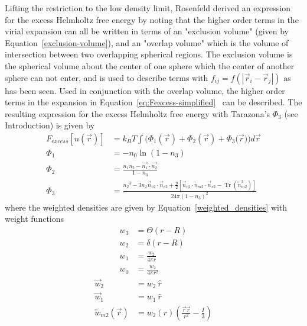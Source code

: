 \documentclass[double,12pt]{beavtex}
\begin{document}
Lifting the restriction to the low density limit, Rosenfeld derived an
expression for the excess Helmholtz free energy by noting that the higher
order terms in the virial expansion can all be written in terms of an 
"exclusion volume" (given by Equation~\ref{exclusion-volume}), 
and an "overlap volume" which is the volume of intersection between two 
overlapping spherical regions.
The exclusion volume is the spherical volume about the center of one sphere 
which the center of another sphere can not enter, and is used to describe
terms with $f_{ij}=f(|\vec r_i - \vec r_j|)$ as has been seen. Used in conjunction 
with the overlap volume, the higher order terms in the expansion
in Equation~\ref{eq:Fexcess-simplified}~\cite{rosenfeld1988} can be described. 
%
The resulting expression for the excess Helmholtz free energy with Tarazona's $\Phi_3$
(see Introduction) is given by
\begin{align}
    F_{excess}[n(\vec{r})] &= k_BT\int(\Phi_1(\vec{r})+\Phi_2(\vec{r})+\Phi_3(\vec{r}{)) d}\vec{r} \\
    \Phi_1 &= -n_{0}\ln(1-n_{3}) \\
    \Phi_2 &= \frac{n_{1}n_{2}-\vec{n_{1}}\cdot\vec{n_{2}}}{1-n_{3}} \\
    \Phi_3 &= \frac{{n_2}^3-3n_2\vec{n}_{v2}\cdot\vec{n}_{v2}+\frac{9}{2}[\vec{n}_{v2}\cdot{\overleftrightarrow{n}_{m2}}\cdot{\vec{n}_{v2}}-\operatorname{Tr}({\overleftrightarrow{n}^3_{m2}})]}{24\pi(1-n_3)^2}  
\end{align}
where the weighted densities are given by Equation~\ref{weighted_densities} with 
weight functions
\begin{align} 
      w_3 &= \Theta(r-R)  \label{scalar-weight3} \\
      w_2 &= \delta(r-R)  \\
      w_1 &= \frac{w_2}{4\pi r}  \\
      w_0 &= \frac{w_2}{4\pi r^2} \label{scalar-weight0}  
\end{align}
\begin{align}      
      \vec {w}_2 &= w_2~\hat r \\
      \vec {w}_1 &= w_1~\hat r \\
      \overleftrightarrow{w}_{m2}(\vec{r}) &= w_2(r)\left(\frac{\vec{r}\vec{r}}{r^2}-\frac{I}{3}\right) 
\end{align}
\end{document}
